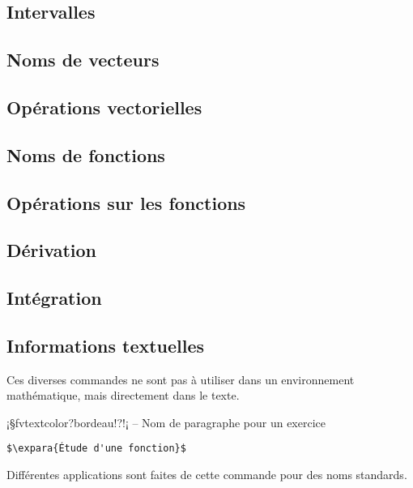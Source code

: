 \documentclass[11pt,a4paper,rgb]{report}
\begin{document}
\subsection{Intervalles}
\subsection{Noms de vecteurs}
\subsection{Opérations vectorielles}
\subsection{Noms de fonctions}
\subsection{Opérations sur les fonctions}
\subsection{Dérivation}
\subsection{Intégration}
\subsection{Informations textuelles}
Ces diverses commandes ne sont pas à utiliser dans un environnement mathématique, mais directement dans le texte.

\vspace*{.75cm}

\inCodeStub¡§fvtextcolor?bordeau!?!¡ -- Nom de paragraphe pour un exercice

\setlength{\leftskip}{.75cm}%
\setlength{\textwidth}{17.25cm}%

\colorbox{blue!15}{}
\hfill
\begin{minipage}{.65\textwidth}
	\begin{lstlisting}[linewidth=\textwidth, language={[LaTeX]TeX}]
	$\expara{Étude d'une fonction}$
	\end{lstlisting}
\end{minipage}

Différentes applications sont faites de cette commande pour des noms standards.
\end{document}
